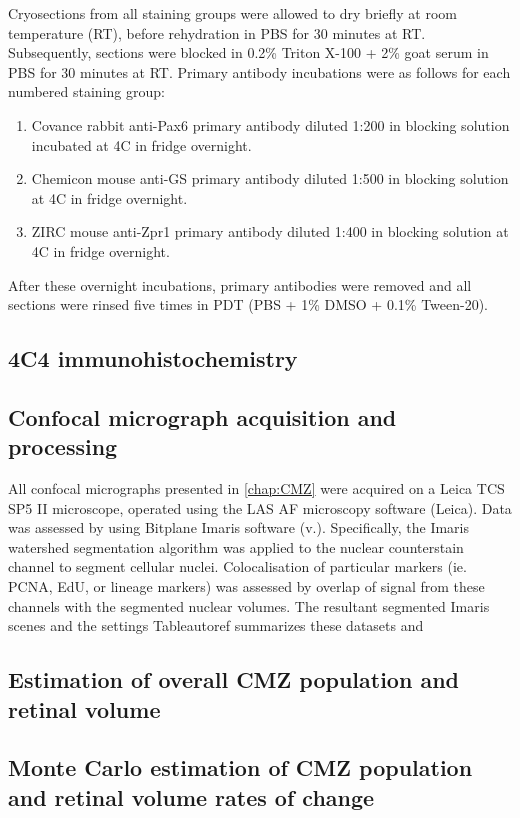 Cryosections from all staining groups were allowed to dry briefly at room temperature (RT), before rehydration in PBS for 30 minutes at RT.  Subsequently, sections were blocked in 0.2\% Triton X-100 + 2\% goat serum in PBS for 30 minutes at RT. Primary antibody incubations were as follows for each numbered staining group:

\begin{enumerate}
    \item Covance rabbit anti-Pax6 primary antibody diluted 1:200 in blocking solution incubated at 4\degree C in fridge overnight.
    \item Chemicon mouse anti-GS primary antibody diluted 1:500 in blocking solution at 4\degree C in fridge overnight.
    \item ZIRC mouse anti-Zpr1 primary antibody diluted 1:400 in blocking solution at 4\degree C in fridge overnight.
\end{enumerate}

After these overnight incubations, primary antibodies were removed and all sections were rinsed five times in PDT (PBS + 1\% DMSO + 0.1\% Tween-20).

\subsection{4C4 immunohistochemistry}

\subsection{Confocal micrograph acquisition and processing}
All confocal micrographs presented in \autoref{chap:CMZ} were acquired on a Leica TCS SP5 II microscope, operated using the LAS AF microscopy software (Leica). Data was assessed by using Bitplane Imaris software (v.). Specifically, the Imaris watershed segmentation algorithm was applied to the nuclear counterstain channel to segment cellular nuclei. Colocalisation of particular markers (ie. PCNA, EdU, or lineage markers) was assessed by overlap of signal from these channels with the segmented nuclear volumes. The resultant segmented Imaris scenes and the settings   Tableautoref summarizes these datasets and 

\subsection{Estimation of overall CMZ population and retinal volume}

\subsection{Monte Carlo estimation of CMZ population and retinal volume rates of change}

